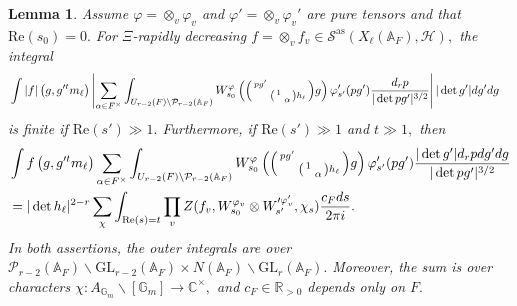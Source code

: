 \documentclass[12pt]{amsart}
\newtheorem{lem}[thm]{Lemma}
\theoremstyle{remark}
\numberwithin{equation}{section}
\newcommand{\A}{\mathbb{A}}
\newcommand{\GL}{\mathrm{GL}}
\newcommand{\CC}{\mathbb{C}}
\newcommand{\RR}{\mathbb{R}}
\newcommand{\GG}{\mathbb{G}}
\theoremstyle{definition}
\newenvironment{psmatrix}
  {\left(\begin{smallmatrix}}
  {\end{smallmatrix}\right)}
\numberwithin{equation}{subsection}
\begin{document}
\begin{lem} \label{lem:unfold:prep} Assume $\varphi=\otimes_v\varphi_v$ and $\varphi'=\otimes_v\varphi_v'$ are pure tensors and that $\mathrm{Re}(s_0)=0.$ For $\Xi$-rapidly decreasing $f=\otimes_v f_v\in \mathcal{S}^{\mathrm{as}}(X_\ell(\A_F),\mathcal{H}),$ the integral
\begin{align*}
&\int|f|\left(g,g'^{t}m_\ell\right)
\left|\sum_{\alpha \in F^\times}\int_{U_{r-2}(F)\backslash \mathcal{P}_{r-2}(\A_F)}  W^\varphi_{s_0}\left(\begin{psmatrix} pg' & \\ & \begin{psmatrix}
    1 & \\
    & \alpha
\end{psmatrix}h_\ell  \end{psmatrix}g \right) \varphi'_{s'}(pg')\frac{d_r p}{|\det pg'|^{3/2}}\right| |\det g'|dg'dg
\end{align*}
is finite if $\mathrm{Re}(s')\gg 1.$ Furthermore, if  $\mathrm{Re}(s')\gg 1$ and $t \gg 1,$ then
\begin{align*}
&\int f\left(g,g'^{t}m_\ell\right)\sum_{\alpha \in F^\times}\int_{U_{r-2}(F)\backslash \mathcal{P}_{r-2}(\A_F)}  W^\varphi_{s_0}\left(\begin{psmatrix} pg' & \\ & \begin{psmatrix}
    1 & \\
    & \alpha
\end{psmatrix}h_\ell  \end{psmatrix}g \right)\varphi'_{s'}(pg') \frac{|\det g'|d_r pdg'dg}{|\det pg'|^{3/2}} \\
   &= |\det h_\ell|^{2-r}\sum_{\chi}\int_{\mathrm{Re}(s)=t}\prod_{v}Z(f_v,W^{\varphi_v}_{s_0}\otimes W'^{\varphi'_v}_{s'},\chi_s)\frac{c_F ds}{2\pi i}.
\end{align*}
In both assertions, the outer integrals are over $\mathcal{P}_{r-2}(\A_F) \backslash \GL_{r-2}(\A_F) \times N(\A_F) \backslash \GL_r(\A_F).$ Moreover, the sum is over characters $\chi:A_{\GG_m} \backslash [\GG_m] \to \CC^\times,$ and $c_F \in \RR_{>0}$ depends only on $F.$
\end{lem}
\end{document}

